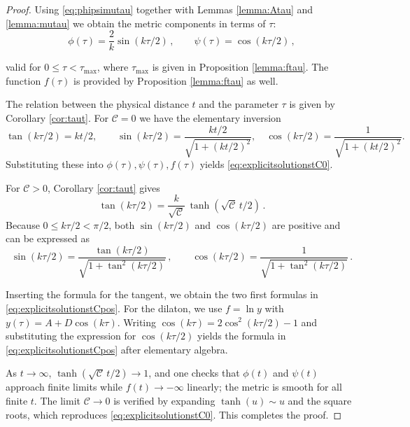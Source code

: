 \documentclass[12pt,a4paper,reqno]{amsart}
\theoremstyle{plain}
\theoremstyle{remark}
\numberwithin{equation}{section}
\newcommand{\cC}{\mathcal{C}}
\begin{document}
\begin{proof}
Using \eqref{eq:phipsimutau} together with Lemmas \ref{lemma:Atau} and \ref{lemma:mutau} we obtain the metric components in terms of $\tau$:
\begin{equation}\label{eq:metricfunctions}
\phi(\tau) = \frac{2}{k}\sin(k\tau/2) \,, \qquad
\psi(\tau) = \cos(k\tau/2) \,,
\end{equation}

valid for $0\le\tau<\tau_{\max}$, where $\tau_{\max}$ is given in Proposition \ref{lemma:ftau}. The function $f(\tau)$ is provided by Proposition \ref{lemma:ftau} as well.

The relation between the physical distance $t$ and the parameter $\tau$ is given by Corollary \ref{cor:taut}.  For $\cC=0$ we have the elementary inversion
\begin{equation*}
\tan(k\tau/2) = kt/2,
\qquad
\sin(k\tau/2) = \frac{k t/2}{\sqrt{1+(kt/2)^{2}}},\quad
\cos(k\tau/2) = \frac{1}{\sqrt{1+(kt/2)^{2}}}.
\end{equation*}
Substituting these into $\phi(\tau),\psi(\tau),f(\tau)$ yields \eqref{eq:explicitsolutionstC0}.

For $\cC>0$, Corollary \ref{cor:taut} gives
\begin{equation*}
\tan(k\tau/2) = \frac{k}{\sqrt{\cC}}\,\tanh(\sqrt{\cC}\,t/2) \,.
\end{equation*}
Because $0\le k\tau/2 < \pi/2$, both $\sin(k\tau/2)$ and $\cos(k\tau/2)$ are positive and can be expressed as
\begin{equation*}
\sin(k\tau/2) = \frac{\tan(k\tau/2)}{\sqrt{1+\tan^2(k\tau/2)}} \,, \qquad
\cos(k\tau/2) = \frac{1}{\sqrt{1+\tan^2(k\tau/2)}} \,.
\end{equation*}

Inserting the formula for the tangent, we obtain the two first formulas in \eqref{eq:explicitsolutionstCpos}. For the dilaton, we use $f = \ln y$ with $y(\tau) = A + D\cos(k\tau)$.  Writing $\cos(k\tau) = 2\cos^{2}(k\tau/2)-1$ and substituting the expression for $\cos(k\tau/2)$ yields the formula in \eqref{eq:explicitsolutionstCpos} after elementary algebra.

As $t\to\infty$, $\tanh(\sqrt{\cC}\,t/2)\to 1$, and one checks that $\phi(t)$ and $\psi(t)$ approach finite limits while $f(t)\to -\infty$ linearly; the metric is smooth for all finite $t$.  The limit $\cC\to 0$ is verified by expanding $\tanh(u)\sim u$ and the square roots, which reproduces \eqref{eq:explicitsolutionstC0}.  This completes the proof.
\end{proof}
\end{document}
